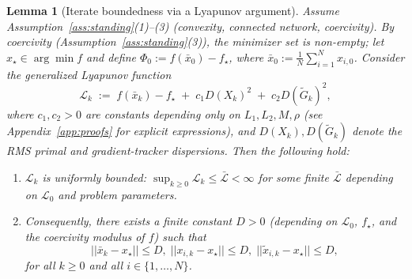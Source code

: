 \documentclass[11pt,a4paper]{article}
\def\norm#1{||#1||}%
\newtheorem{lemma}[theorem]{Lemma}
\newcommand{\norm}[1]{\left\|#1\right\|}
\begin{document}
	\begin{lemma}[Iterate boundedness via a Lyapunov argument]\label{lem:lyap_bound}
		Assume Assumption~\ref{ass:standing}(1)--(3) (convexity, connected network, coercivity).
		By coercivity (Assumption~\ref{ass:standing}(3)), the minimizer set is non-empty;
		let $x_\star\in\arg\min f$ and define
		$\Phi_0:=f(\bar x_0)-f_\star$, where $\bar x_0:=\frac1N\sum_{i=1}^N x_{i,0}$.
		Consider the generalized Lyapunov function
		\[
		\mathcal L_k \;:=\; f(\bar x_k)-f_\star \;+\; c_1 D(X_k)^2 \;+\; c_2 D(\tilde G_k)^2,
		\]
		where $c_1,c_2>0$ are constants depending only on $L_1,L_2,M,\rho$
		(see Appendix~\ref{app:proofs} for explicit expressions), and
		$D(X_k), D(\tilde G_k)$ denote the RMS primal and gradient-tracker dispersions.
		Then the following hold:
		\begin{enumerate}[leftmargin=1.2em,itemsep=2pt]
			\item $\mathcal L_k$ is uniformly bounded: $\sup_{k\ge 0}\mathcal L_k \le \bar{\mathcal L} < \infty$ for some finite $\bar{\mathcal L}$ depending on $\mathcal L_0$ and problem parameters.
			\item Consequently, there exists a finite constant $D>0$
			(depending on $\mathcal L_0$, $f_\star$, and the coercivity modulus of $f$)
			such that
			\begin{equation}\label{eq:bounded_levelset}
				\norm{\bar x_k\!-\!x_\star}\!\le\! D,\;
				\norm{x_{i,k}\!-\!x_\star}\!\le\! D,\;
				\norm{\tilde x_{i,k}\!-\!x_\star}\!\le\! D,
			\end{equation}
			for all $k\ge 0$ and all $i\in\{1,\dots,N\}$.
		\end{enumerate}
	\end{lemma}
\end{document}
